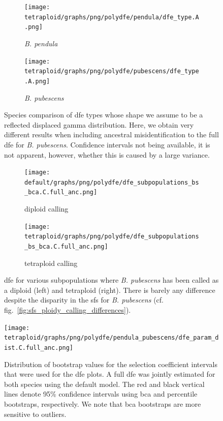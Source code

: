 \documentclass[hidelinks,11pt]{article}
\newcommand{\pendula}{\textit{B. pendula}}
\newcommand{\pubescens}{\textit{B. pubescens}}
\begin{document}
    \begin{figure}[H]
        \centering
        \begin{subfigure}[b]{0.49\textwidth}
            \centering
            \texttt{[image: tetraploid/graphs/png/polydfe/pendula/dfe\_type.A.png]}
            \caption{\pendula{}}
        \end{subfigure}
        \hfill
        \begin{subfigure}[b]{0.49\textwidth}
            \centering
            \texttt{[image: tetraploid/graphs/png/polydfe/pubescens/dfe\_type.A.png]}
            \caption{\pubescens{}}
        \end{subfigure}
        \caption{Species comparison of \acrshort{dfe} types whose shape we assume to be a reflected displaced gamma distribution. Here, we obtain very different results when including ancestral misidentification to the full \acrshort{dfe} for \pubescens{}. Confidence intervals not being available, it is not apparent, however, whether this is caused by a large variance.}
        \label{fig:dfe_type_A}
    \end{figure}

    \begin{figure}[H]
        \centering
        \begin{subfigure}[b]{0.49\textwidth}
            \centering
            \texttt{[image: default/graphs/png/polydfe/dfe\_subpopulations\_bs\_bca.C.full\_anc.png]}
            \caption{diploid calling}
        \end{subfigure}
        \hfill
        \begin{subfigure}[b]{0.49\textwidth}
            \centering
            \texttt{[image: tetraploid/graphs/png/polydfe/dfe\_subpopulations\_bs\_bca.C.full\_anc.png]}
            \caption{tetraploid calling}
        \end{subfigure}
        \caption{\acrshort{dfe} for various subpopulations where \pubescens{} has been called as a diploid (left) and tetraploid (right). There is barely any difference despite the disparity in the \acrshort{sfs} for \pubescens{} (cf. fig.~\ref{fig:sfs_ploidy_calling_differences}).}
        \label{fig:dfe_subpopulation_calling_methods}
    \end{figure}

    \begin{figure}[H]
        \centering
        \texttt{[image: tetraploid/graphs/png/polydfe/pendula\_pubescens/dfe\_param\_dist.C.full\_anc.png]}
        \caption{Distribution of bootstrap values for the selection coefficient intervals that were used for the \acrshort{dfe} plots. A full \acrshort{dfe} was jointly estimated for both species using the default model. The red and black vertical lines denote 95\% confidence intervals using \acrshort{bca} and percentile bootstraps, respectively. We note that \acrshort{bca} bootstraps are more sensitive to outliers.}
        \label{fig:dfe_parameter_dict}
    \end{figure}
\end{document}
